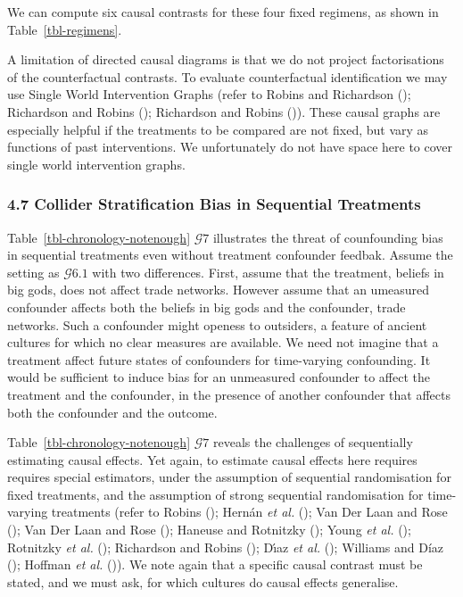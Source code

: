 \documentclass[
  single column]{article}
\begin{document}
We can compute six causal contrasts for these four fixed regimens, as
shown in Table~\ref{tbl-regimens}.

A limitation of directed causal diagrams is that we do not project
factorisations of the counterfactual contrasts. To evaluate
counterfactual identification we may use Single World Intervention
Graphs (refer to Robins and Richardson
(); Richardson and Robins
(); Richardson and Robins
()). These causal graphs are
especially helpful if the treatments to be compared are not fixed, but
vary as functions of past interventions. We unfortunately do not have
space here to cover single world intervention graphs.

\subsubsection{4.7 Collider Stratification Bias in Sequential
Treatments}\label{collider-stratification-bias-in-sequential-treatments}

Table~\ref{tbl-chronology-notenough} \(\mathcal{G} 7\) illustrates the
threat of counfounding bias in sequential treatments even without
treatment confounder feedbak. Assume the setting as \(\mathcal{G} 6.1\)
with two differences. First, assume that the treatment, beliefs in big
gods, does not affect trade networks. However assume that an umeasured
confounder affects both the beliefs in big gods and the confounder,
trade networks. Such a confounder might openess to outsiders, a feature
of ancient cultures for which no clear measures are available. We need
not imagine that a treatment affect future states of confounders for
time-varying confounding. It would be sufficient to induce bias for an
unmeasured confounder to affect the treatment and the confounder, in the
presence of another confounder that affects both the confounder and the
outcome.

Table~\ref{tbl-chronology-notenough} \(\mathcal{G} 7\) reveals the
challenges of sequentially estimating causal effects. Yet again, to
estimate causal effects here requires requires special estimators, under
the assumption of sequential randomisation for fixed treatments, and the
assumption of strong sequential randomisation for time-varying
treatments (refer to Robins (); Hernán
\emph{et al.} (); Van Der Laan
and Rose (); Van Der Laan and Rose
(); Haneuse and Rotnitzky
(); Young \emph{et al.}
(); Rotnitzky \emph{et al.}
(); Richardson and Robins
(); Dı́az \emph{et al.}
(); Williams and Díaz
(); Hoffman \emph{et al.}
()). We note again that a specific
causal contrast must be stated, and we must ask, for which cultures do
causal effects generalise.
\end{document}
